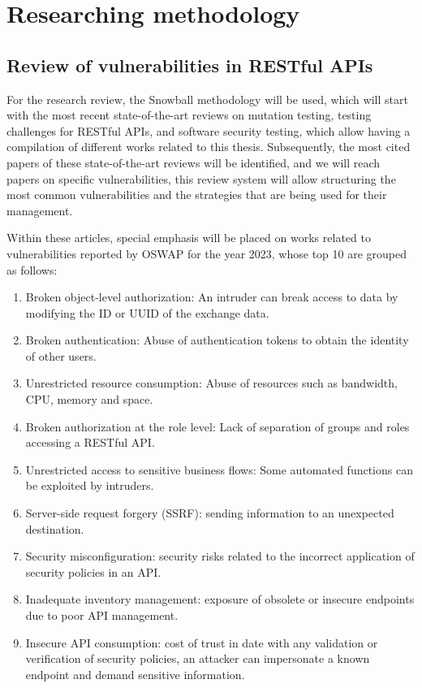 \section{Researching methodology}

\subsection{ Review of vulnerabilities in RESTful APIs} 

For the research review, the Snowball methodology\cite{Chaim2008}  will be used, which will start with the most recent state-of-the-art reviews on mutation testing\cite{Papadakis2019}, testing challenges for RESTful APIs\cite{Ehsan2022}, and software security testing\cite{Golmohammadi2023}, which allow having a compilation of different works related to this thesis. Subsequently, the most cited papers of these state-of-the-art reviews will be identified, and we will reach papers on specific vulnerabilities, this review system will allow structuring the most common vulnerabilities and the strategies that are being used for their management.

Within these articles, special emphasis will be placed on works related to vulnerabilities reported by OSWAP for the year 2023, whose top 10 are grouped as follows:


\begin{enumerate}
    \item Broken object-level authorization: An intruder can break access to data by modifying the ID or UUID of the exchange data.
    \item Broken authentication: Abuse of authentication tokens to obtain the identity of other users.
    \item Unrestricted resource consumption: Abuse of resources such as bandwidth, CPU, memory and space.
    \item Broken authorization at the role level: Lack of separation of groups and roles accessing a RESTful API.
    \item Unrestricted access to sensitive business flows: Some automated functions can be exploited by intruders.
    \item Server-side request forgery (SSRF): sending information to an unexpected destination.
    \item Security misconfiguration: security risks related to the incorrect application of security policies in an API.
    \item Inadequate inventory management: exposure of obsolete or insecure endpoints due to poor API management.
    \item Insecure API consumption: cost of trust in date with any validation or verification of security policies, an attacker can impersonate a known endpoint and demand sensitive information.
\end{enumerate}



